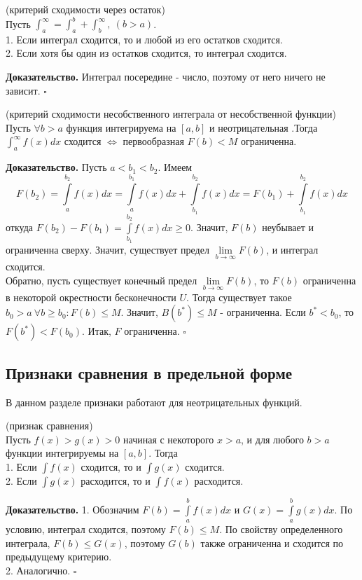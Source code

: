 \begin{theor} (критерий сходимости через остаток)\\
Пусть $\int^\infty_a=\int^b_a+\int^\infty_b,~(b>a)$.\\
1. Если интеграл сходится, то и любой из его остатков сходится.\\
2. Если хотя бы один из остатков сходится, то интеграл сходится.
\end{theor}
\textbf{Доказательство.} Интеграл посередине - число, поэтому от него ничего
не зависит. 
$\square$ 

\begin{theor} (критерий сходимости несобственного интеграла от несобственной
функции)\\
Пусть $\forall b>a$ функция интегрируема на $[a,b]$ и неотрицательная .Тогда
$\int^\infty_af(x)dx$ сходится $\Leftrightarrow$ первообразная $F(b)<M$ 
ограниченна.
\end{theor}
\textbf{Доказательство.} Пусть $a<b_1<b_2$. Имеем
$$F(b_2)=\int\limits_{a}^{b_2}f(x)dx=\int\limits_{a}^{b_1}f(x)dx+
\int\limits_{b_1}^{b_2}f(x)dx=F(b_1)+\int\limits_{b_1}^{b_2}f(x)dx$$
откуда $F(b_2)-F(b_1)=\int\limits_{b_1}^{b_2}f(x)dx\geqslant 0$. Значит,
$F(b)$ неубывает и ограниченна сверху. Значит, существует предел
$\lim\limits_{b \to \infty}F(b)$, и интеграл сходится.\\
Обратно, пусть существует конечный предел $\lim\limits_{b \to \infty} F(b)$,
то $F(b)$ ограниченна в некоторой окрестности бесконечности $U$.
Тогда существует такое $b_0>a~\forall b\geqslant b_0:F(b)\leqslant M$.
Значит, $B(b^*)\leqslant M$ - ограниченна. Если $b^*<b_0$, то
$F(b^*)<F(b_0)$. Итак, $F$ ограниченна. $\square$

\subsection{Признаки сравнения в предельной форме}
В данном разделе признаки работают для неотрицательных функций.
\begin{theor} (признак сравнения)\\
Пусть $f(x)>g(x)>0$ начиная с некоторого $x>a$, и для любого  $b>a$
функции интегрируемы на $[a,b]$. Тогда\\
1. Если  $\int f(x)$ сходится, то и  $\int g(x)$  сходится.\\
2. Если  $\int g(x)$ расходится, то и $\int f(x)$ расходится.
\end{theor}
\textbf{Доказательство.} 1. Обозначим $F(b)=\int\limits_{a}^{b}f(x)dx$ и
$G(x)=\int\limits_{a}^{b}g(x)dx$. По условию, интеграл сходится, поэтому
$F(b)\leqslant M$. По свойству определенного интеграла, $F(b)\leqslant G(x)$,
поэтому $G(b)$ также ограниченна и сходится по предыдущему критерию.\\
2. Аналогично. $\square$ 

